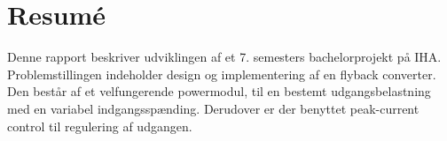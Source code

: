 \chapter{Resumé}
Denne rapport beskriver udviklingen af et 7. semesters bachelorprojekt på IHA. Problemstillingen indeholder design og implementering af en flyback converter. Den består af et velfungerende powermodul, til en bestemt udgangsbelastning med en variabel indgangsspænding. Derudover er der benyttet peak-current control til regulering af udgangen. 